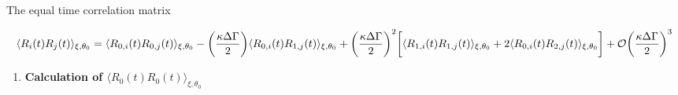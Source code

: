 \documentclass[]{article}
\begin{document}
The equal time correlation matrix

\[\langle R_i(t)R_j(t)\rangle_{\xi,\theta_0} =\langle R_{0,i}(t)R_{0,j}(t)\rangle_{\xi,\theta_0} - \bigg(\frac{\kappa \Delta \Gamma}{2}\bigg)\langle R_{0,i}(t)R_{1,j}(t)\rangle_{\xi,\theta_0}+\bigg(\frac{\kappa \Delta \Gamma}{2}\bigg)^2 \bigg[\langle R_{1,i}(t)R_{1,j}(t)\rangle_{\xi,\theta_0}\\+  2\langle R_{0,i}(t)R_{2,j}(t)\rangle_{\xi,\theta_0}\bigg] +\mathcal{O}\bigg(\frac{\kappa \Delta \Gamma}{2}\bigg)^3\]

\begin{enumerate}
\def\labelenumi{\arabic{enumi}.}
\item
  \textbf{Calculation of
  \(\langle R_{0}(t)R_{0}(t)\rangle_{\xi,\theta_0} \)}
\end{enumerate}
\end{document}
